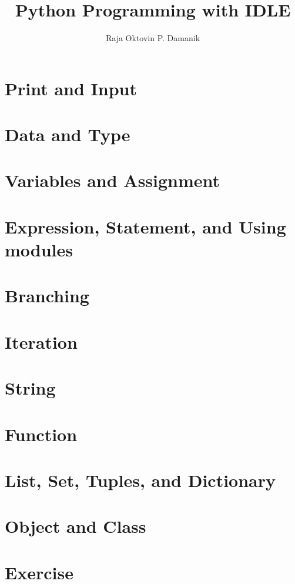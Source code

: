 \documentclass[14pt]{extarticle}
\title{Python Programming with IDLE}
\author{Raja Oktovin P. Damanik}
\begin{document}
\maketitle

\section{Print and Input}

\section{Data and Type}

\section{Variables and Assignment}

\section{Expression, Statement, and Using modules}

\section{Branching}

\section{Iteration}

\section{String}

\section{Function}

\section{List, Set, Tuples, and Dictionary}

\section{Object and Class}

\section{Exercise}
\end{document}
